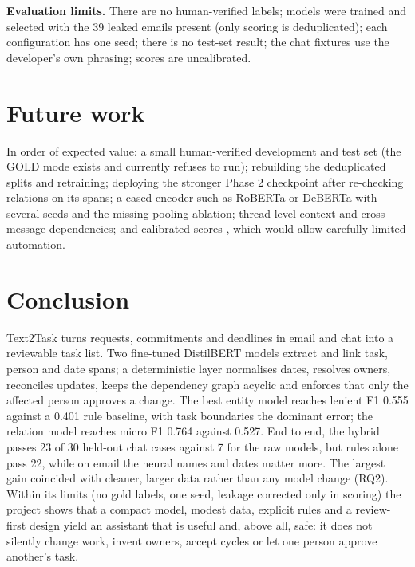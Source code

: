 \textbf{Evaluation limits.} There are no human-verified labels; models were trained and selected with the 39 leaked emails present (only scoring is deduplicated); each configuration has one seed; there is no test-set result; the chat fixtures use the developer's own phrasing; scores are uncalibrated.

\section{Future work}
In order of expected value: a small human-verified development and test set (the GOLD mode exists and currently refuses to run); rebuilding the deduplicated splits and retraining; deploying the stronger Phase 2 checkpoint after re-checking relations on its spans; a cased encoder such as RoBERTa or DeBERTa \citep{liu2019roberta,he2021deberta} with several seeds and the missing pooling ablation; thread-level context and cross-message dependencies; and calibrated scores \citep{guo2017calibration}, which would allow carefully limited automation.

\section{Conclusion}
Text2Task turns requests, commitments and deadlines in email and chat into a reviewable task list. Two fine-tuned DistilBERT models extract and link task, person and date spans; a deterministic layer normalises dates, resolves owners, reconciles updates, keeps the dependency graph acyclic and enforces that only the affected person approves a change. The best entity model reaches lenient F1 0.555 against a 0.401 rule baseline, with task boundaries the dominant error; the relation model reaches micro F1 0.764 against 0.527. End to end, the hybrid passes 23 of 30 held-out chat cases against 7 for the raw models, but rules alone pass 22, while on email the neural names and dates matter more. The largest gain coincided with cleaner, larger data rather than any model change (RQ2). Within its limits (no gold labels, one seed, leakage corrected only in scoring) the project shows that a compact model, modest data, explicit rules and a review-first design yield an assistant that is useful and, above all, safe: it does not silently change work, invent owners, accept cycles or let one person approve another's task.
